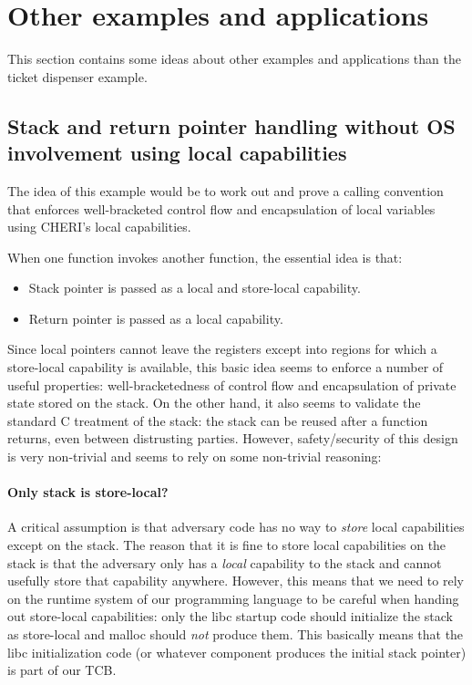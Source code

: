 \documentclass[a4paper]{article}
\begin{document}
\section{Other examples and applications}
\label{sec:other_apps}
This section contains some ideas about other examples and applications than the
ticket dispenser example.

\subsection{Stack and return pointer handling without OS involvement using local
  capabilities}
The idea of this example would be to work out and prove a calling convention
that enforces well-bracketed control flow and encapsulation of local variables
using CHERI's local capabilities.

When one function invokes another function, the essential idea is that:
\begin{itemize}
\item Stack pointer is passed as a local and store-local capability.
\item Return pointer is passed as a local capability.
\end{itemize}

Since local pointers cannot leave the registers except into regions for which a
store-local capability is available, this basic idea seems to enforce a number
of useful properties: well-bracketedness of control flow and encapsulation of
private state stored on the stack. On the other hand, it also seems to validate
the standard C treatment of the stack: the stack can be reused after a function
returns, even between distrusting parties. However, safety/security of this
design is very non-trivial and seems to rely on some non-trivial reasoning:

\paragraph{Only stack is store-local?}
A critical assumption is that adversary code has no way to \emph{store} local
capabilities except on the stack. The reason that it is fine to store local
capabilities on the stack is that the adversary only has a \emph{local}
capability to the stack and cannot usefully store that capability anywhere.
However, this means that we need to rely on the runtime system of our
programming language to be careful when handing out store-local capabilities:
only the libc startup code should initialize the stack as store-local and malloc
should \emph{not} produce them. This basically means that the libc
initialization code (or whatever component produces the initial stack pointer)
is part of our TCB.
\end{document}
